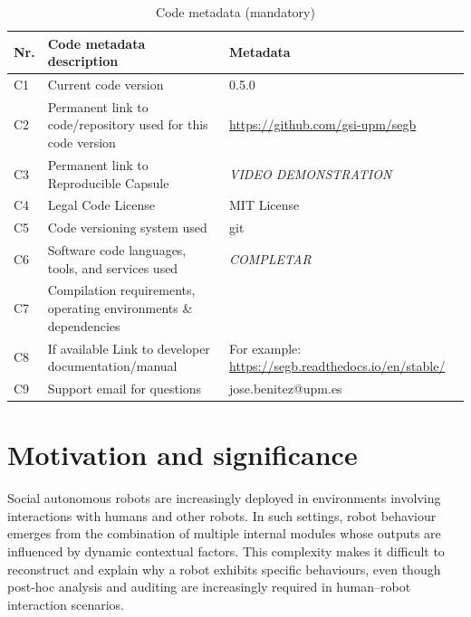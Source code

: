\documentclass[preprint,12pt, a4paper]{elsarticle}
\begin{document}
\begin{table}[!h]
\begin{tabular}{|l|p{6.5cm}|p{6.5cm}|}
\hline
\textbf{Nr.} & \textbf{Code metadata description} & \textbf{Metadata} \\
\hline
C1 & Current code version & 0.5.0 \\ 
\hline
C2 & Permanent link to code/repository used for this code version & \url{https://github.com/gsi-upm/segb} \\
\hline
C3  & Permanent link to Reproducible Capsule &  \textit{VIDEO DEMONSTRATION} \\
\hline
C4 & Legal Code License   & MIT License \\
\hline
C5 & Code versioning system used & git \\
\hline
C6 & Software code languages, tools, and services used & \textit{COMPLETAR} \\
\hline
C7 & Compilation requirements, operating environments \& dependencies & \\
\hline
C8 & If available Link to developer documentation/manual & For example: \url{https://segb.readthedocs.io/en/stable/} \\
\hline
C9 & Support email for questions & jose.benitez@upm.es \\
\hline
\end{tabular}
\caption{Code metadata (mandatory)}
\label{codeMetadata} 
\end{table}



\section{Motivation and significance}



Social autonomous robots are increasingly deployed in environments involving interactions with humans and other robots. In such settings, robot behaviour emerges from the combination of multiple internal modules whose outputs are influenced by dynamic contextual factors. This complexity makes it difficult to reconstruct and explain why a robot exhibits specific behaviours, even though post-hoc analysis and auditing are increasingly required in human–robot interaction scenarios. 

\end{document}
